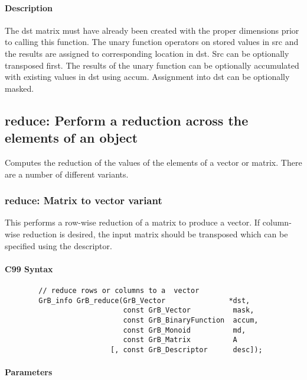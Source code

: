 \paragraph{Description}

The dst matrix must have already been created with the proper dimensions
prior to calling this function.  The unary function operators on stored values in src and the results are assigned to corresponding location in dst.
Src can be optionally transposed first.  The results of the unary function can be optionally accumulated with existing values in dst using accum.  Assignment into dst can be optionally masked.


\subsection{{\sf reduce}: Perform a reduction across the elements of an object}

Computes the reduction of the values of the elements of a vector or matrix.  There are a number of different variants.

\subsubsection{{\sf reduce}: Matrix to vector variant}

This performs a row-wise reduction of a matrix to produce a vector.  If column-wise reduction
is desired, the input matrix should be transposed which can be specified using the descriptor.

\paragraph{C99 Syntax}

\begin{verbatim}
        // reduce rows or columns to a  vector
        GrB_info GrB_reduce(GrB_Vector               *dst,
                            const GrB_Vector          mask,
                            const GrB_BinaryFunction  accum,
                            const GrB_Monoid          md,  
                            const GrB_Matrix          A
                         [, const GrB_Descriptor      desc]);
\end{verbatim}

\paragraph{Parameters}

